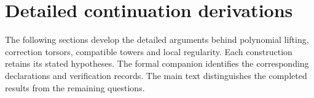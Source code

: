 \clearpage
\section{Detailed continuation derivations}\label{app:continuation}
The following sections develop the detailed arguments behind polynomial
lifting, correction torsors, compatible towers and local regularity. Each
construction retains its stated hypotheses. The formal companion identifies
the corresponding declarations and verification records. The main text
distinguishes the completed results from the remaining questions.











